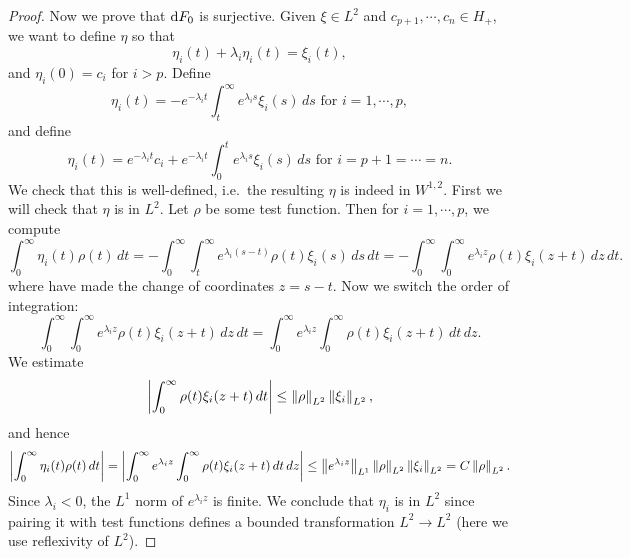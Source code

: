 \documentclass{amsart}
\begin{document}
\begin{proof}
  Now we prove that $\mathrm{d} F_{0}$ is surjective. Given $\xi\in L^{2}$ and $c_{p+1},\cdots,c_{n}\in H_{+}$, we want to define $\eta$ so that
  \begin{equation*}
    \eta_{i}(t)+\lambda_{i}\eta_{i}(t)=\xi_{i}(t),
  \end{equation*}
  and $\eta_{i}(0)=c_{i}$ for $i>p$. Define
  \begin{equation*}
    \eta_{i}(t)=-e^{-\lambda_{i}t}\int_{t}^{\infty}e^{\lambda_{i}s}\xi_{i}(s)\,ds\text{ for $i=1,\cdots,p$},
  \end{equation*}
  and define
  \begin{equation*}
    \eta_{i}(t)=e^{-\lambda_{i}t}c_{i}+e^{-\lambda_{i}t}\int_{0}^{t}e^{\lambda_{i}s}\xi_{i}(s)\,ds\text{ for $i=p+1=\cdots=n$.}
  \end{equation*}
  We check that this is well-defined, i.e.\ the resulting $\eta$ is indeed in $W^{1,2}$. First we will check that $\eta$ is in $L^{2}$. Let $\rho$ be some test function. Then for $i=1,\cdots,p$, we compute
  \begin{equation*}
    \int_{0}^{\infty}\eta_{i}(t)\rho(t)\,dt=-\int_{0}^{\infty}\int_{t}^{\infty}e^{\lambda_{i}(s-t)}\rho(t)\xi_{i}(s)\,ds\,dt=-\int_{0}^{\infty}\int_{0}^{\infty}e^{\lambda_{i}z}\rho(t)\xi_{i}(z+t)\,dz\,dt.
  \end{equation*}
  where have made the change of coordinates $z=s-t$. Now we switch the order of integration:
  \begin{equation*}    \int_{0}^{\infty}\int_{0}^{\infty}e^{\lambda_{i}z}\rho(t)\xi_{i}(z+t)\,dz\,dt=\int_{0}^{\infty}e^{\lambda_{i}z}\int_{0}^{\infty}\rho(t)\xi_{i}(z+t)\,dt\,dz.
  \end{equation*}
  We estimate
  \begin{equation*}
    \left|\int_{0}^{\infty}\rho(t)\xi_{i}(z+t)\,dt\right|\le \left\lVert\rho\right\rVert_{L^{2}}\left\lVert\xi_{i}\right\rVert_{L^{2}},
  \end{equation*}
  and hence
  \begin{equation*}
    \left|\int_{0}^{\infty}\eta_{i}(t)\rho(t)\,dt\right|= \left|\int_{0}^{\infty}e^{\lambda_{i}z}\int_{0}^{\infty}\rho(t)\xi_{i}(z+t)\,dt\,dz\right|\le \left\lVert e^{\lambda_{i}z}\right\rVert_{L^{1}}\left\lVert\rho\right\rVert_{L^{2}}\left\lVert\xi_{i}\right\rVert_{L^{2}}=C\left\lVert\rho\right\rVert_{L^{2}}.
  \end{equation*}
  Since $\lambda_{i}<0$, the $L^{1}$ norm of $e^{\lambda_{i}z}$ is finite. We conclude that $\eta_{i}$ is in $L^{2}$ since pairing it with test functions defines a bounded transformation $L^{2}\to L^{2}$ (here we use reflexivity of $L^{2}$).


\end{proof}
\end{document}
